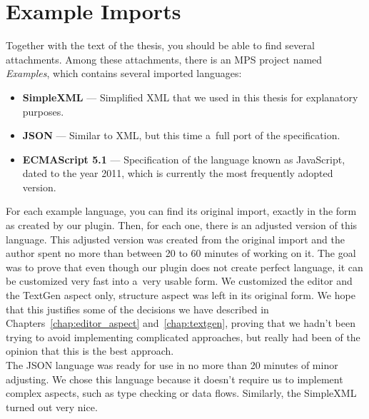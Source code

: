 \chapter{Example Imports}
\label{chap:examples}

Together with the text of the thesis, you should be able to find several attachments.
Among these attachments, there is an MPS project named \textit{Examples}, which contains several imported languages:

\begin{itemize}
	\item \textbf{SimpleXML} --- Simplified XML that we used in this thesis for explanatory purposes.

	\item \textbf{JSON} --- Similar to XML, but this time a~full port of the specification.

	\item \textbf{ECMAScript 5.1} --- Specification of the language known as JavaScript, dated to the year 2011, which is currently the most frequently adopted version.
\end{itemize}

For each example language, you can find its original import, exactly in the form as created by our plugin.
Then, for each one, there is an adjusted version of this language.
This adjusted version was created from the original import and the author spent no more than between 20 to 60 minutes of working on it.
The goal was to prove that even though our plugin does not create perfect language, it can be customized very fast into a~very usable form.
We customized the editor and the TextGen aspect only, structure aspect was left in its original form.
We hope that this justifies some of the decisions we have described in Chapters~\ref{chap:editor_aspect} and~\ref{chap:textgen}, proving that we hadn't been trying to avoid implementing complicated approaches, but really had been of the opinion that this is the best approach.
\\

The JSON language was ready for use in no more than 20 minutes of minor adjusting.
We chose this language because it doesn't require us to implement complex aspects, such as type checking or data flows.
Similarly, the SimpleXML turned out very nice.
\\

